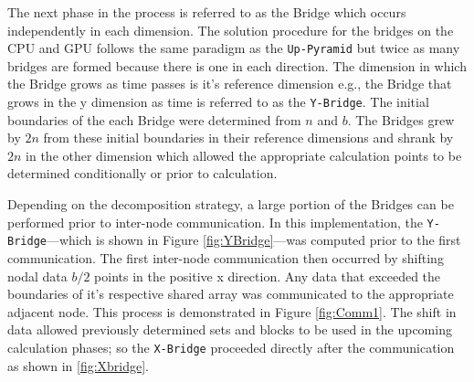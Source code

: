 \documentclass[review]{elsarticle}
\def\Up{\texttt{Up-Pyramid}}
\def\Xb{\texttt{X-Bridge}}
\def\Yb{\texttt{Y-Bridge}}
\begin{document}
\par The next phase in the process is referred to as the Bridge which occurs independently in each dimension. The solution procedure for the bridges on the CPU and GPU follows the same paradigm as the \Up{} but twice as many bridges are formed because there is one in each direction. The dimension in which the Bridge grows as time passes is it's reference dimension e.g., the Bridge that grows in the y dimension as time is referred to as the \Yb{}. The initial boundaries of the each Bridge were determined from $n$ and $b$. The Bridges grew by $2n$ from these initial boundaries in their reference dimensions and shrank by $2n$ in the other dimension which allowed the appropriate calculation points to be determined conditionally or prior to calculation.

\par
Depending on the decomposition strategy, a large portion of the Bridges can be performed prior to inter-node communication. In this implementation, the \Yb{}---which is shown in Figure \ref{fig:YBridge}---was computed prior to the first communication. The first inter-node communication then occurred by shifting nodal data $b/2$ points in the positive x direction. Any data that exceeded the boundaries of it's respective shared array was communicated to the appropriate adjacent node. This process is demonstrated in Figure \ref{fig:Comm1}. The shift in data allowed previously determined sets and blocks to be used in the upcoming calculation phases; so the \Xb{} proceeded directly after the communication as shown in \ref{fig:Xbridge}.
\end{document}
